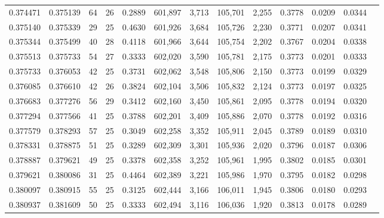 \begin{tabular}{rrrrrrrrrrrrr}
0.374471 & 0.375139 &  64 &  26 &                                     0.2889 & 601,897 &   3,713 & 105,701 &   2,255 & 0.3778 & 0.0209 & 0.0344 \\
0.375140 & 0.375339 &  29 &  25 &                                     0.4630 & 601,926 &   3,684 & 105,726 &   2,230 & 0.3771 & 0.0207 & 0.0341 \\
0.375344 & 0.375499 &  40 &  28 &                                     0.4118 & 601,966 &   3,644 & 105,754 &   2,202 & 0.3767 & 0.0204 & 0.0338 \\
0.375513 & 0.375733 &  54 &  27 &                                     0.3333 & 602,020 &   3,590 & 105,781 &   2,175 & 0.3773 & 0.0201 & 0.0333 \\
0.375733 & 0.376053 &  42 &  25 &                                     0.3731 & 602,062 &   3,548 & 105,806 &   2,150 & 0.3773 & 0.0199 & 0.0329 \\
0.376085 & 0.376610 &  42 &  26 &                                     0.3824 & 602,104 &   3,506 & 105,832 &   2,124 & 0.3773 & 0.0197 & 0.0325 \\
0.376683 & 0.377276 &  56 &  29 &                                     0.3412 & 602,160 &   3,450 & 105,861 &   2,095 & 0.3778 & 0.0194 & 0.0320 \\
0.377294 & 0.377566 &  41 &  25 &                                     0.3788 & 602,201 &   3,409 & 105,886 &   2,070 & 0.3778 & 0.0192 & 0.0316 \\
0.377579 & 0.378293 &  57 &  25 &                                     0.3049 & 602,258 &   3,352 & 105,911 &   2,045 & 0.3789 & 0.0189 & 0.0310 \\
0.378331 & 0.378875 &  51 &  25 &                                     0.3289 & 602,309 &   3,301 & 105,936 &   2,020 & 0.3796 & 0.0187 & 0.0306 \\
0.378887 & 0.379621 &  49 &  25 &                                     0.3378 & 602,358 &   3,252 & 105,961 &   1,995 & 0.3802 & 0.0185 & 0.0301 \\
0.379621 & 0.380086 &  31 &  25 &                                     0.4464 & 602,389 &   3,221 & 105,986 &   1,970 & 0.3795 & 0.0182 & 0.0298 \\
0.380097 & 0.380915 &  55 &  25 &                                     0.3125 & 602,444 &   3,166 & 106,011 &   1,945 & 0.3806 & 0.0180 & 0.0293 \\
0.380937 & 0.381609 &  50 &  25 &                                     0.3333 & 602,494 &   3,116 & 106,036 &   1,920 & 0.3813 & 0.0178 & 0.0289 \\

\end{tabular}
